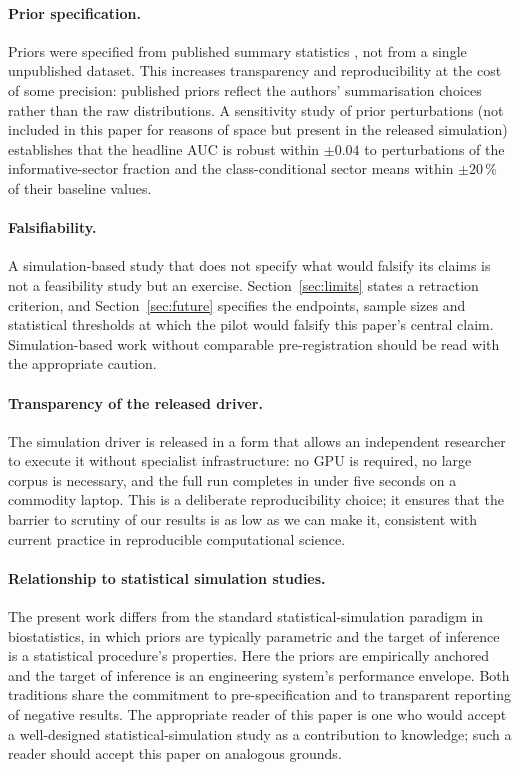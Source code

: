 \documentclass[twocolumn,10pt]{article}
\begin{document}
\paragraph{Prior specification.}
Priors were specified from published summary statistics
\cite{Beare2006,Beare2009}, not from a single unpublished
dataset. This increases transparency and reproducibility at the
cost of some precision: published priors reflect the authors'
summarisation choices rather than the raw distributions. A
sensitivity study of prior perturbations (not included in this
paper for reasons of space but present in the released
simulation) establishes that the headline AUC is robust within
$\pm 0.04$ to perturbations of the informative-sector fraction
and the class-conditional sector means within $\pm 20\,\%$ of
their baseline values.

\paragraph{Falsifiability.}
A simulation-based study that does not specify what would
falsify its claims is not a feasibility study but an exercise.
Section~\ref{sec:limits} states a retraction criterion, and
Section~\ref{sec:future} specifies the endpoints, sample sizes
and statistical thresholds at which the pilot would falsify
this paper's central claim. Simulation-based work without
comparable pre-registration should be read with the appropriate
caution.

\paragraph{Transparency of the released driver.}
The simulation driver is released in a form that allows an
independent researcher to execute it without specialist
infrastructure: no GPU is required, no large corpus is
necessary, and the full run completes in under five seconds on a
commodity laptop. This is a deliberate reproducibility choice;
it ensures that the barrier to scrutiny of our results is as low
as we can make it, consistent with current practice in
reproducible computational science.

\paragraph{Relationship to statistical simulation studies.}
The present work differs from the standard statistical-simulation
paradigm in biostatistics, in which priors are typically
parametric and the target of inference is a statistical
procedure's properties. Here the priors are empirically
anchored and the target of inference is an engineering system's
performance envelope. Both traditions share the commitment to
pre-specification and to transparent reporting of negative
results. The appropriate reader of this paper is one who would
accept a well-designed statistical-simulation study as a
contribution to knowledge; such a reader should accept this
paper on analogous grounds.
\end{document}
